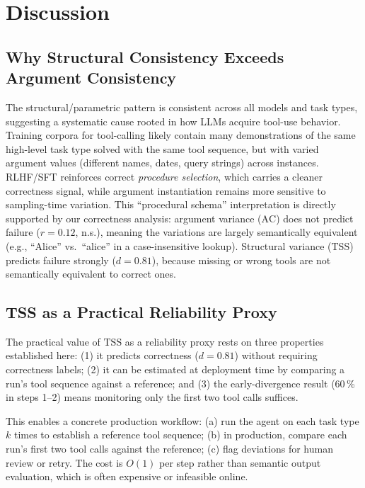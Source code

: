 \documentclass[letterpaper]{article}
\newcommand{\tss}{\mathrm{TSS}}
\newcommand{\ac}{\mathrm{AC}}
\begin{document}
\section{Discussion}

\subsection{Why Structural Consistency Exceeds Argument Consistency}
\label{sec:why}

The structural/parametric pattern is consistent across all models and task types,
suggesting a systematic cause rooted in how LLMs acquire tool-use behavior.
Training corpora for tool-calling likely contain many demonstrations of the same
high-level task type solved with the same tool sequence, but with varied argument
values (different names, dates, query strings) across instances. RLHF/SFT
reinforces correct \emph{procedure selection}, which carries a cleaner correctness
signal, while argument instantiation remains more sensitive to sampling-time
variation. This ``procedural schema'' interpretation is directly supported by our
correctness analysis: argument variance ($\ac$) does not predict failure ($r =
0.12$, n.s.), meaning the variations are largely semantically equivalent (e.g.,
``Alice'' vs.\ ``alice'' in a case-insensitive lookup). Structural variance ($\tss$)
predicts failure strongly ($d = 0.81$), because missing or wrong tools are not
semantically equivalent to correct ones.

\subsection{TSS as a Practical Reliability Proxy}
\label{sec:tss_proxy}

The practical value of $\tss$ as a reliability proxy rests on three properties
established here: (1) it predicts correctness ($d = 0.81$) without requiring
correctness labels; (2) it can be estimated at deployment time by comparing a
run's tool sequence against a reference; and (3) the early-divergence result
(60\,\% in steps 1--2) means monitoring only the first two tool calls suffices.

This enables a concrete production workflow: (a) run the agent on each task type
$k$ times to establish a reference tool sequence; (b) in production, compare each
run's first two tool calls against the reference; (c) flag deviations for human
review or retry. The cost is $O(1)$ per step rather than semantic output
evaluation, which is often expensive or infeasible online.
\end{document}
